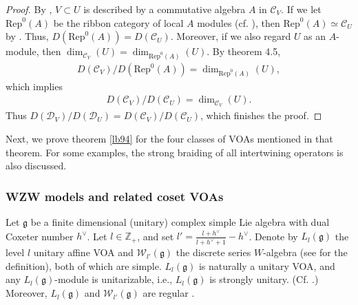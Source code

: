 \documentclass[11pt,b5paper,notitlepage]{article}
\theoremstyle{definition}
\theoremstyle{plain}
\newcommand{\mc}{\mathcal}
\newcommand{\Rep}{\mathrm{Rep}}
\newcommand{\gk}{\mathfrak g}
\newcommand{\mbb}{\mathbb}
\numberwithin{equation}{subsection}
\begin{document}
\begin{proof}
By \cite{HKL15}, $V\subset U$ is described by a commutative algebra $A$ in $\mc C_V$. If we let $\Rep^0(A)$ be the ribbon category  of local $A$ modules (cf. \cite{KO02}), then $\Rep^0(A)\simeq \mc C_U$ by \cite{CKR17}. Thus, $D(\Rep^0(A))=D(\mc C_U)$. Moreover, if we also regard $U$ as an $A$-module, then $\dim_{\mc C_V}(U)=\dim_{\Rep^0(A)}(U)$. By \cite{KO02} theorem 4.5,
\begin{align*}
D(\mc C_V)/D(\Rep^0(A))=\dim_{\Rep^0(A)}(U),
\end{align*}
which implies
\begin{align*}
D(\mc C_V)/D(\mc C_U)=\dim_{\mc C_V}(U).
\end{align*}
Thus $D(\mc D_V)/D(\mc D_U)=D(\mc C_V)/D(\mc C_U)$, which finishes the proof.
\end{proof}








Next, we prove theorem \ref{lb94} for the four classes of VOAs mentioned in that theorem. For some examples, the strong braiding of all intertwining operators is also discussed.

\subsubsection*{WZW models and related coset VOAs}











































Let $\gk$ be a finite dimensional (unitary) complex simple Lie algebra with dual Coxeter number $h^\vee$. Let  $l\in\mbb Z_+$, and set $l'=\frac{l+h^\vee}{l+h^\vee+1}-h^\vee$. Denote by $L_l(\gk)$ the level $l$ unitary affine VOA and $\mc W_{l'}(\gk)$ the discrete series $W$-algebra (see \cite{ACL19} for the definition), both of which are simple.   $L_l(\gk)$ is naturally a unitary VOA, and any $L_l(\gk)$-module is unitarizable, i.e., $L_l(\gk)$ is strongly unitary. (Cf. \cite{Kac90,DL14,CKLW18,Gui19c}.) Moreover, $L_l(\gk)$ and $\mc W_{l'}(\gk)$ are regular \cite{DLM97,Ara15a,Ara15b}.
\end{document}
